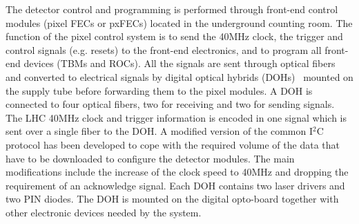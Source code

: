 The detector control and programming is performed through front-end control modules (pixel FECs or pxFECs) located in the underground counting room.
The function of the pixel control system is to send the 40\unit{MHz} clock, the trigger and control signals (e.g. resets) to the front-end electronics,
and to program all front-end devices (TBMs and ROCs).
All the signals are sent through optical fibers and converted to electrical signals by digital optical hybrids (DOHs)~\cite{1221923} mounted on the supply tube before forwarding them to the pixel modules.
A DOH is connected to four optical fibers, two for receiving and two for sending signals. The LHC 40\unit{MHz} clock and trigger information is encoded in one signal which is sent over a single fiber to the DOH. 
A modified version of the common I$^2$C protocol has been developed to cope with the required volume of the data that have to be downloaded to configure the detector modules.
The main modifications include the increase of the clock speed to 40\unit{MHz} and dropping the requirement of an acknowledge signal.
Each DOH contains two laser drivers and two PIN diodes. The DOH is mounted on the digital opto-board together with other electronic devices needed by the system.

